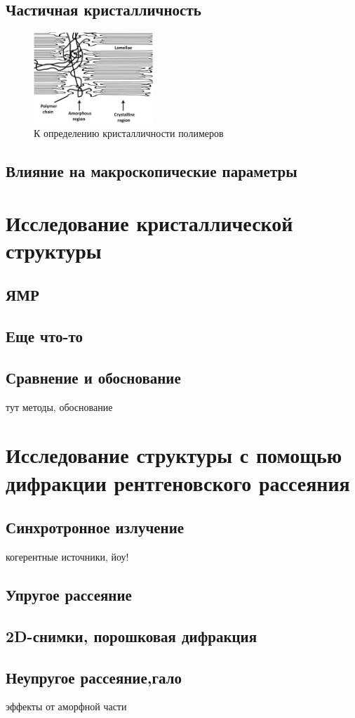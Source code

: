 \subsection{Частичная кристалличность}

	
	\begin{figure} 
\vspace{-20pt}
  \begin{center}
    \includegraphics[width=0.4\textwidth]{fig/crystal-2.jpg}
    \caption{К определению кристалличности полимеров}
    \label{fig:crystal-2}
  \end{center}
  \vspace{-20pt}
  \vspace{1pt}
\end{figure}	

\subsection{Влияние на макроскопические параметры}

\section{Исследование кристаллической структуры}
\subsection{ЯМР}
\subsection{Еще что-то}
\subsection{Сравнение и обоснование}
тут методы, обоснование

\section{Исследование структуры с помощью дифракции рентгеновского рассеяния}

\subsection{Синхротронное излучение}
когерентные источники, йоу!
\subsection{Упругое рассеяние}
\subsection{2D-снимки, порошковая дифракция}
\subsection{Неупругое рассеяние,гало}
эффекты от аморфной части



	